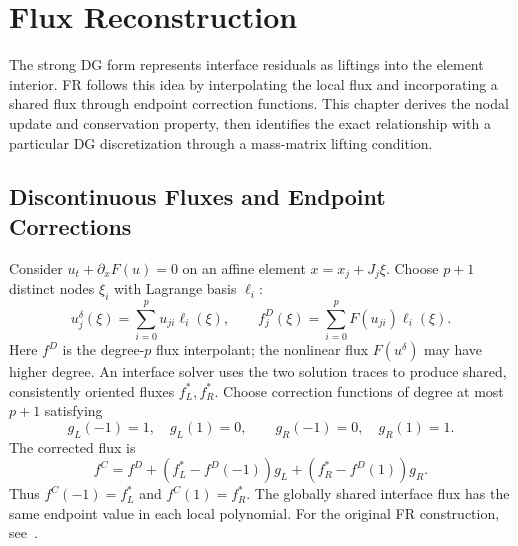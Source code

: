 \chapter{Flux Reconstruction}\label{ch:11}
\begin{chaptersummary}
The strong DG form represents interface residuals as liftings into the element interior. FR follows this idea by interpolating the local flux and incorporating a shared flux through endpoint correction functions. This chapter derives the nodal update and conservation property, then identifies the exact relationship with a particular DG discretization through a mass-matrix lifting condition.
\end{chaptersummary}

\section{Discontinuous Fluxes and Endpoint Corrections}
Consider $u_t+\partial_xF(u)=0$ on an affine element $x=x_j+J_j\xi$.
Choose $p+1$ distinct nodes $\xi_i$ with Lagrange basis $\ell_i$:
\[
u_j^\delta(\xi)=\sum_{i=0}^pu_{ji}\ell_i(\xi),\qquad
f_j^D(\xi)=\sum_{i=0}^pF(u_{ji})\ell_i(\xi).
\]
Here $f^D$ is the degree-$p$ flux interpolant; the nonlinear flux $F(u^\delta)$ may have higher degree.
An interface solver uses the two solution traces to produce shared, consistently oriented fluxes $f_L^*,f_R^*$.
Choose correction functions of degree at most $p+1$ satisfying
\[
g_L(-1)=1,\quad g_L(1)=0,\qquad
g_R(-1)=0,\quad g_R(1)=1.
\]
The corrected flux is
\begin{equation}\label{eq:fr-flux}
f^C=f^D+(f_L^*-f^D(-1))g_L+(f_R^*-f^D(1))g_R.
\end{equation}
Thus $f^C(-1)=f_L^*$ and $f^C(1)=f_R^*$.
The globally shared interface flux has the same endpoint value in each local polynomial. For the original FR construction, see~\cite{huynh2007}.


